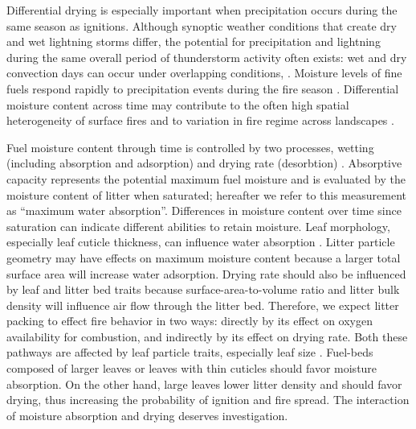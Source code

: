 \documentclass[letterpaper,12pt]{article}
\begin{document}
Differential drying is especially important when precipitation occurs
during the same season as ignitions. Although synoptic weather conditions that
create dry and wet lightning storms differ, the potential for precipitation and
lightning during the same overall period of thunderstorm activity often exists:
wet and dry convection days can occur under overlapping conditions,
\citep{Rorig+Ferguson-1999}. Moisture levels of fine fuels respond rapidly to
precipitation events during the fire season \citep{Estes+Knapp+etal-2012}.
Differential moisture content across time may contribute to the often high
spatial heterogeneity of surface fires \citep{Hille+Stephens-2005,
  Knapp+Keeley-2006, Kreye_Hiers_etal-2018} and to variation in fire regime
across landscapes \citep{Stephens-2001}.

Fuel moisture content through time is controlled by two processes, wetting
(including absorption and adsorption) and drying rate (desorbtion)
\citep{Anderson-1990, Kreye+Kobziar+etal-2013}. Absorptive capacity represents
the potential maximum fuel moisture and is evaluated by the moisture content of
litter when saturated; hereafter we refer to this measurement as ``maximum
water absorption''. Differences in moisture content over time since saturation
can indicate different abilities to retain moisture. Leaf morphology,
especially leaf cuticle thickness, can influence water absorption
\citep{Van_Wagner-1969}. Litter particle geometry may have effects on maximum
moisture content because a larger total surface area will increase water
adsorption. Drying rate should also be influenced by leaf and litter bed traits
because surface-area-to-volume ratio and litter bulk density will influence air
flow through the litter bed. Therefore, we expect litter packing to effect fire
behavior in two ways: directly by its effect on oxygen availability for
combustion, and indirectly by its effect on drying rate. Both these pathways
are affected by leaf particle traits, especially leaf size
\citep{Scarff+Westoby-2006}. Fuel-beds composed of larger leaves or leaves with
thin cuticles should favor moisture absorption. On the other hand, large leaves
lower litter density and should favor drying, thus increasing the probability
of ignition and fire spread. The interaction of moisture absorption and drying
deserves investigation.
\end{document}
